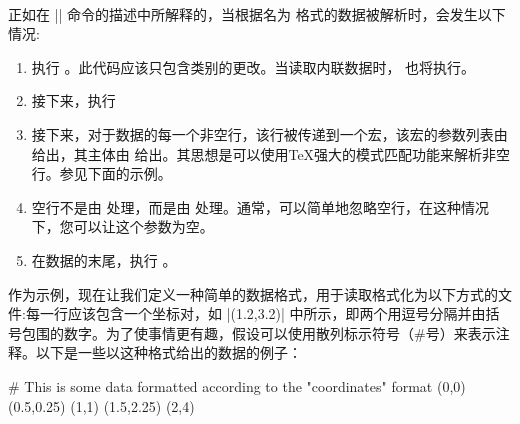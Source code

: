 \begin{command}{\pgfdeclaredataformat\parbox[t]{0.7\textwidth}{\\\hspace{\length}}}
    正如在 |\pgfdata| 命令的描述中所解释的，当根据名为  格式的数据被解析时，会发生以下情况:
    \begin{enumerate}
        \item 执行 。此代码应该只包含类别的更改。当读取内联数据时， 也将执行。
        \item 接下来，执行 
        \item 接下来，对于数据的每一个非空行，该行被传递到一个宏，该宏的参数列表由  给出，其主体由  给出。其思想是可以使用\TeX 强大的模式匹配功能来解析非空行。参见下面的示例。
        \item 空行不是由  处理，而是由  处理。通常，可以简单地忽略空行，在这种情况下，您可以让这个参数为空。
        \item 在数据的末尾，执行 。
    \end{enumerate}


    作为示例，现在让我们定义一种简单的数据格式，用于读取格式化为以下方式的文件:每一行应该包含一个坐标对，如 |(1.2,3.2)| 中所示，即两个用逗号分隔并由括号包围的数字。为了使事情更有趣，假设可以使用散列标示符号（\#号）来表示注释。以下是一些以这种格式给出的数据的例子：
\begin{codeexample}
# This is some data formatted according to the "coordinates" format
(0,0)
(0.5,0.25)
(1,1)
(1.5,2.25)
(2,4)
\end{codeexample}


\end{command}
